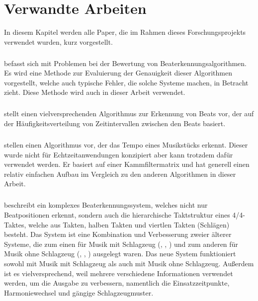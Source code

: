\chapter{Verwandte Arbeiten}
\label{verwandte_arbeiten}
\acresetall

In diesem Kapitel werden alle Paper,
	die im Rahmen dieses Forschungsprojekts verwendet wurden,
	kurz vorgestellt.

\paragraph{\cite{1997_GoMu1}}
{
	befasst sich mit Problemen bei der Bewertung von Beaterkennungsalgorithmen.
	Es wird eine Methode zur Evaluierung der Genauigkeit dieser Algorithmen vorgestellt,
		welche auch typische Fehler,
		die solche Systeme machen,
		in Betracht zieht.
	Diese Methode wird auch in dieser Arbeit verwendet.
}


\paragraph{\cite{2000_Di}}
{
	stellt einen vielversprechenden Algorithmus zur Erkennung von Beats vor,
		der auf der Häufigkeitsverteilung von Zeitintervallen zwischen den Beats basiert.
}

\paragraph{\cite{2001_BeatThis}}
{
	stellen einen Algorithmus vor,
		der das Tempo eines Musikstücks erkennt.
	Dieser wurde nicht für Echtzeitanwendungen konzipiert
		aber kann trotzdem dafür verwendet werden.
	Er basiert auf einer Kammfiltermatrix
		und hat generell einen relativ einfachen Aufbau im Vergleich zu den anderen Algorithmen in dieser Arbeit.
}

\paragraph{\cite{2001_Go}}
{
	beschreibt ein komplexes Beaterkennungssystem,
		welches nicht nur Beatpositionen erkennt,
		sondern auch die hierarchische Taktstruktur eines 4/4-Taktes,
		welche aus Takten, halben Takten und viertlen Takten (Schlägen) besteht.
	Das System ist eine Kombination und Verbesserung zweier älterer Systeme,
		die zum einen für Musik mit Schlagzeug (\cite{1994_GoMu}, \cite{1995_GoMu1}, \cite{1998_GoMu})
		und zum anderen für Musik ohne Schlagzeug (\cite{1996_GoMu}, \cite{1997_GoMu2}, \cite{1999_GoMu})
		ausgelegt waren.
	Das neue System funktioniert sowohl mit Musik mit Schlagzeug als auch mit Musik ohne Schlagzeug.
	Au{\ss}erdem ist es vielversprechend,
		weil mehrere verschiedene Informationen verwendet werden,
		um die Ausgabe zu verbessern,
		namentlich die Einsatzzeitpunkte, Harmoniewechsel und gängige Schlagzeugmuster.
}

